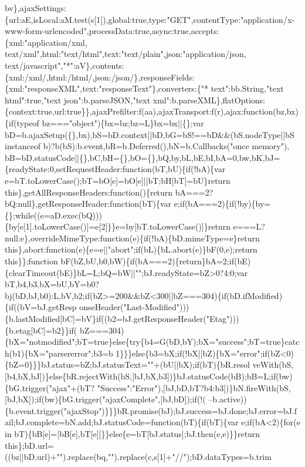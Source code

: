 \begin{DoxyCode}
{      bv\},ajaxSettings:\{url:aE,isLocal:aM.test(s[1]),global:true,type:"GET",contentType:"application/x-www-form-urlencoded",processData:true,async:true,accepts:\{xml:"application/xml,
       text/xml",html:"text/html",text:"text/plain",json:"application/json,
       text/javascript","*":aV\},contents:\{xml:/xml/,html:/html/,json:/json/\},responseFields:\{xml:"responseXML",text:"responseText"\},converters:\{"* text":bb.String,"text html":true,"text
       json":b.parseJSON,"text
       xml":b.parseXML\},flatOptions:\{context:true,url:true\}\},ajaxPrefilter:f(aa),ajaxTransport:f(r),ajax:function(bz,bx)\{if(typeof bz==="object")\{bx=bz;bz=L\}bx=bx||\{\};var
       bD=b.ajaxSetup(\{\},bx),bS=bD.context||bD,bG=bS!==bD&&(bS.nodeType||bS instanceof b)?b(bS):b.event,bR=b.Deferred(),bN=b.Callbacks("once
       memory"),
      bB=bD.statusCode||\{\},bC,bH=\{\},bO=\{\},bQ,by,bL,bE,bI,bA=0,bw,bK,bJ=\{readyState:0,setRequestHeader:function(bT,bU)\{if(!bA)\{var e=bT.toLowerCase();bT=bO[e]=bO[e]||bT;bH[bT]=bU\}return
       this\},getAllResponseHeaders:function()\{return bA===2?bQ:null\},getResponseHeader:function(bT)\{var
       e;if(bA===2)\{if(!by)\{by=\{\};while((e=aD.exec(bQ)))\{by[e[1].toLowerCase()]=e[2]\}\}e=by[bT.toLowerCase()]\}return
       e===L?null:e\},overrideMimeType:function(e)\{if(!bA)\{bD.mimeType=e\}return this\},abort:function(e)\{e=e||"abort";if(bL)\{bL.abort(e)\}bF(0,e);return
       this\}\};function
       bF(bZ,bU,b0,bW)\{if(bA===2)\{return\}bA=2;if(bE)\{clearTimeout(bE)\}bL=L;bQ=bW||"";bJ.readyState=bZ>0?4:0;var
       bT,b4,b3,bX=bU,bY=b0?bj(bD,bJ,b0):L,bV,b2;if(bZ>=200&&bZ<300||bZ===304)\{if(bD.ifModified)\{if((bV=bJ.getResp
      onseHeader("Last-Modified")))\{b.lastModified[bC]=bV\}if((b2=bJ.getResponseHeader("Etag")))\{b.etag[bC]=b2\}\}if(
      bZ===304)\{bX="notmodified";bT=true\}else\{try\{b4=G(bD,bY);bX="success";bT=true\}catch(b1)\{bX="parsererror";b3=b
      1\}\}\}else\{b3=bX;if(!bX||bZ)\{bX="error";if(bZ<0)\{bZ=0\}\}\}bJ.status=bZ;bJ.statusText=""+(bU||bX);if(bT)\{bR.resol
      veWith(bS,[b4,bX,bJ])\}else\{bR.rejectWith(bS,[bJ,bX,b3])\}bJ.statusCode(bB);bB=L;if(bw)\{bG.trigger("ajax"+(bT?
      "Success":"Error"),[bJ,bD,bT?b4:b3])\}bN.fireWith(bS,[bJ,bX]);if(bw)\{bG.trigger("ajaxComplete",[bJ,bD]);if(!(
      --b.active))\{b.event.trigger("ajaxStop")\}\}\}bR.promise(bJ);bJ.success=bJ.done;bJ.error=bJ.fail;bJ.complete=bN.add;bJ.statusCode=function(bT)\{if(bT)\{var e;if(bA<2)\{for(e in
       bT)\{bB[e]=[bB[e],bT[e]]\}\}else\{e=bT[bJ.status];bJ.then(e,e)\}\}return
       this\};bD.url=((bz||bD.url)+"").replace(bq,"").replace(c,s[1]+"//");bD.dataTypes=b.trim
}
\end{DoxyCode}
